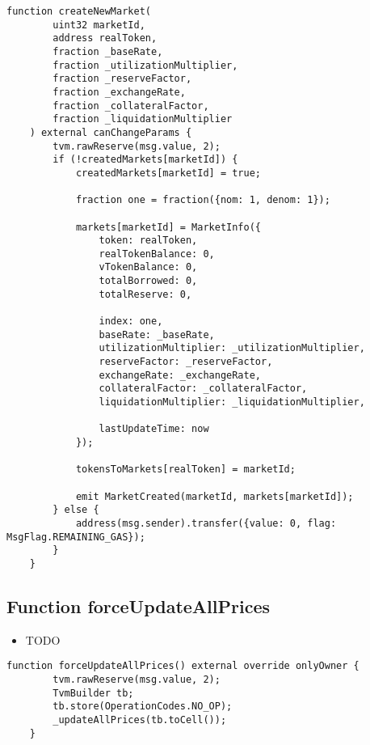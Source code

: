\begin{lstlisting}[firstnumber=242]
    function createNewMarket(
        uint32 marketId, 
        address realToken,
        fraction _baseRate,
        fraction _utilizationMultiplier,
        fraction _reserveFactor,
        fraction _exchangeRate,
        fraction _collateralFactor,
        fraction _liquidationMultiplier
    ) external canChangeParams {
        tvm.rawReserve(msg.value, 2);
        if (!createdMarkets[marketId]) {
            createdMarkets[marketId] = true;
            
            fraction one = fraction({nom: 1, denom: 1});

            markets[marketId] = MarketInfo({
                token: realToken,
                realTokenBalance: 0,
                vTokenBalance: 0,
                totalBorrowed: 0,
                totalReserve: 0,

                index: one,
                baseRate: _baseRate,
                utilizationMultiplier: _utilizationMultiplier,
                reserveFactor: _reserveFactor,
                exchangeRate: _exchangeRate,
                collateralFactor: _collateralFactor,
                liquidationMultiplier: _liquidationMultiplier,

                lastUpdateTime: now
            });

            tokensToMarkets[realToken] = marketId;

            emit MarketCreated(marketId, markets[marketId]);
        } else {
            address(msg.sender).transfer({value: 0, flag: MsgFlag.REMAINING_GAS});
        }
    }
\end{lstlisting}

\subsection{Function forceUpdateAllPrices}

\noindent\begin{itemize}
\item TODO
\end{itemize}

\begin{lstlisting}[firstnumber=471]
    function forceUpdateAllPrices() external override onlyOwner {
        tvm.rawReserve(msg.value, 2);
        TvmBuilder tb;
        tb.store(OperationCodes.NO_OP);
        _updateAllPrices(tb.toCell());
    }
\end{lstlisting}

